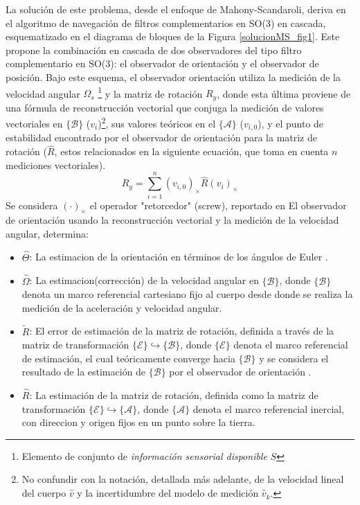 \documentclass[conference]{IEEEtran}
\newcommand{\marco}[1]{\{\mathcal{#1}\}}
\begin{document}
La solución de este problema, desde el enfoque de Mahony-Scandaroli, deriva en el algoritmo de navegación de filtros complementarios en SO(3) en cascada, esquematizado en el diagrama de bloques de la Figura \ref{solucionMS_fig1}. 
Este propone la combinación en cascada de dos observadores del tipo filtro complementario en SO(3): el observador de orientación y el observador de posición. Bajo este esquema, el observador orientación utiliza la medición de la velocidad angular $\Omega_s$ \footnote{ Elemento de conjunto de \emph{información sensorial disponible} $S$} y la matriz de rotación $R_y$, donde esta última proviene de una fórmula de  reconstrucción vectorial que conjuga la medición de valores vectoriales en $\marco{B}$ ($v_i$)\footnote{No confundir con la notación, detallada más adelante, de la velocidad lineal del cuerpo $\hat{v}$ y la incertidumbre del modelo de medición $\hat{v}_k$.}, sus valores teóricos en el $\marco{A}$ ($v_{i,0}$), y el punto de estabilidad encontrado por el observador de orientación para la matriz de rotación ($\hat{R}$, estos relacionados en la siguiente ecuación, que toma en cuenta $n$ mediciones vectoriales).
\begin{equation}\label{ReconstruccionVectorial}
R_y=\sum_{i=1}^{n}(v_{i,0})_\times\hat{R}(v_i)_\times
\end{equation}
Se considera $(\cdot)_\times$ el operador "retorcedor" (screw), reportado en \cite{Mahony2008}
El observador de orientación usando la reconstrucción vectorial y la medición de la velocidad angular, determina:
\begin{itemize}
\item $\hat{\Theta}$: La estimacion de la orientación en términos de los ángulos de Euler .
\item  $\hat{\Omega}$: La estimacion(corrección) de la velocidad angular en $\marco{B}$, donde $\marco{B}$ denota un marco referencial cartesiano fijo al cuerpo desde donde se realiza la medición de la aceleración y velocidad angular.
\item $\tilde{R}$: El error de estimación de la matriz de rotación, definida a través de la matriz de transformación $\marco{E}\hookrightarrow\marco{B}$, donde $\marco{E}$ denota el marco referencial de estimación, el cual teóricamente converge hacia $\marco{B}$ y se considera el resultado de la estimación de $\marco{B}$ por el observador de orientación .
\item $\hat{R}$: La estimación de la matriz de rotación, definida como la matriz de transformación $ \marco{E}\hookrightarrow\marco{A}$,  donde $\marco{A}$ denota el marco referencial inercial, con direccion y origen fijos en un punto sobre la tierra.
\end{itemize}
\end{document}
